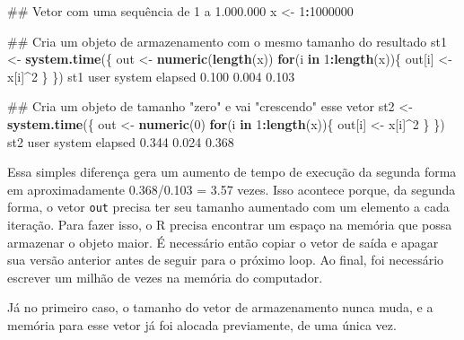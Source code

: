 \documentclass[10pt,a4paper]{book}
\newenvironment{Shaded}{\begin{snugshade}}{\end{snugshade}}
\newcommand{\KeywordTok}[1]{\textcolor[rgb]{0.13,0.29,0.53}{\textbf{#1}}}
\newcommand{\DecValTok}[1]{\textcolor[rgb]{0.00,0.00,0.81}{#1}}
\newcommand{\FloatTok}[1]{\textcolor[rgb]{0.00,0.00,0.81}{#1}}
\newcommand{\StringTok}[1]{\textcolor[rgb]{0.31,0.60,0.02}{#1}}
\newcommand{\ControlFlowTok}[1]{\textcolor[rgb]{0.13,0.29,0.53}{\textbf{#1}}}
\newcommand{\OperatorTok}[1]{\textcolor[rgb]{0.81,0.36,0.00}{\textbf{#1}}}
\newcommand{\NormalTok}[1]{#1}
\begin{document}
\begin{Shaded}
\begin{Highlighting}[]
\NormalTok{## Vetor com uma sequência de 1 a 1.000.000}
\NormalTok{x <-}\StringTok{ }\DecValTok{1}\OperatorTok{:}\DecValTok{1000000}

\NormalTok{## Cria um objeto de armazenamento com o mesmo tamanho do resultado}
\NormalTok{st1 <-}\StringTok{ }\KeywordTok{system.time}\NormalTok{(\{}
\NormalTok{    out <-}\StringTok{ }\KeywordTok{numeric}\NormalTok{(}\KeywordTok{length}\NormalTok{(x))}
    \ControlFlowTok{for}\NormalTok{(i }\ControlFlowTok{in} \DecValTok{1}\OperatorTok{:}\KeywordTok{length}\NormalTok{(x))\{}
\NormalTok{        out[i] <-}\StringTok{ }\NormalTok{x[i]}\OperatorTok{^}\DecValTok{2}
\NormalTok{    \}}
\NormalTok{\})}
\NormalTok{st1}
\NormalTok{   user  system elapsed }
  \FloatTok{0.100}   \FloatTok{0.004}   \FloatTok{0.103} 

\NormalTok{## Cria um objeto de tamanho "zero" e vai "crescendo" esse vetor}
\NormalTok{st2 <-}\StringTok{ }\KeywordTok{system.time}\NormalTok{(\{}
\NormalTok{    out <-}\StringTok{ }\KeywordTok{numeric}\NormalTok{(}\DecValTok{0}\NormalTok{)}
    \ControlFlowTok{for}\NormalTok{(i }\ControlFlowTok{in} \DecValTok{1}\OperatorTok{:}\KeywordTok{length}\NormalTok{(x))\{}
\NormalTok{        out[i] <-}\StringTok{ }\NormalTok{x[i]}\OperatorTok{^}\DecValTok{2}
\NormalTok{    \}}
\NormalTok{\})}
\NormalTok{st2}
\NormalTok{   user  system elapsed }
  \FloatTok{0.344}   \FloatTok{0.024}   \FloatTok{0.368} 
\end{Highlighting}
\end{Shaded}

Essa simples diferença gera um aumento de tempo de execução da segunda
forma em aproximadamente 0.368/0.103 = 3.57 vezes. Isso acontece porque,
da segunda forma, o vetor \texttt{out} precisa ter seu tamanho aumentado
com um elemento a cada iteração. Para fazer isso, o R precisa encontrar
um espaço na memória que possa armazenar o objeto maior. É necessário
então copiar o vetor de saída e apagar sua versão anterior antes de
seguir para o próximo loop. Ao final, foi necessário escrever um milhão
de vezes na memória do computador.

Já no primeiro caso, o tamanho do vetor de armazenamento nunca muda, e a
memória para esse vetor já foi alocada previamente, de uma única vez.
\end{document}
